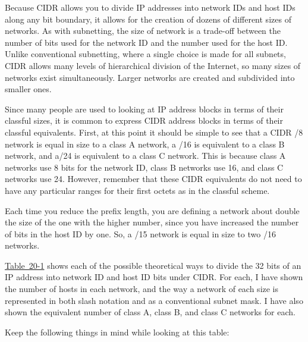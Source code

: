 \protect\hypertarget{ch20s03.html}{}{}

Because CIDR allows you to divide IP addresses into network IDs and host
IDs along any bit boundary, it allows for the creation of dozens of
different sizes of networks. As with subnetting, the size of network is
a trade-off between the number of bits used for the network ID and the
number used for the host ID. Unlike conventional subnetting, where a
single choice is made for all subnets, CIDR allows many levels of
hierarchical division of the Internet, so many sizes of networks exist
simultaneously. Larger networks are created and subdivided into smaller
ones.

Since many people are used to looking at IP address
\protect\hypertarget{ch20s03.htmlux5cux23idx-CHP-20-0770}{}{}blocks in
terms of their classful sizes, it is common to express CIDR address
blocks in terms of their classful equivalents. First, at this point it
should be simple to see that a CIDR /8 network is equal in size to a
class A network, a /16 is equivalent to a class B network, and a/24 is
equivalent to a class C network. This is because class A networks use 8
bits for the network ID, class B networks use 16, and class C networks
use 24. However, remember that these CIDR equivalents do not need to
have any particular ranges for their first octets as in the classful
scheme.

Each time you reduce the prefix length, you are defining a network about
double the size of the one with the higher number, since you have
increased the number of bits in the host ID by one. So, a /15 network is
equal in size to two /16 networks.

\protect\hyperlink{ch20s03.htmlux5cux23cidr_address_blocks_and_classful_address}{Table~20-1}
shows each of the possible theoretical ways to divide the 32 bits of an
IP address into network ID and host ID bits under CIDR. For each, I have
shown the number of hosts in each network, and the way a network of each
size is represented in both slash notation and as a conventional subnet
mask. I have also shown the equivalent number of class A, class B, and
class C networks for each.

Keep the following things in mind while looking at this table:

